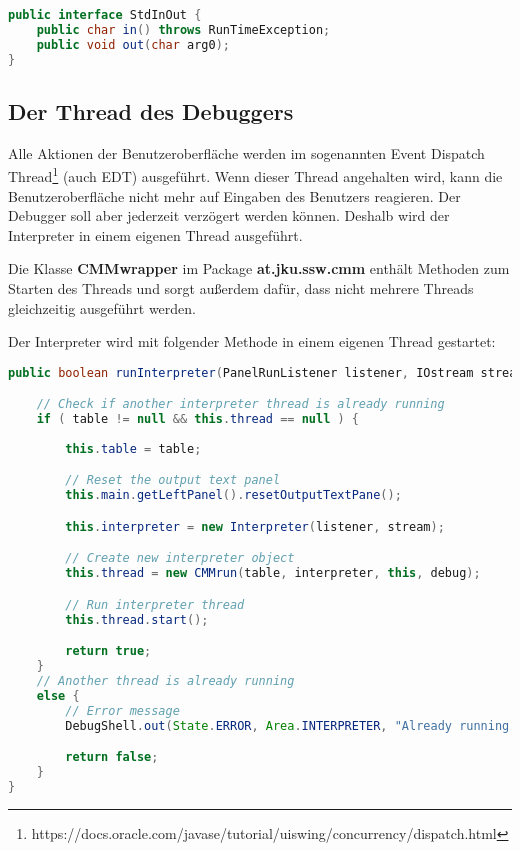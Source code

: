 \begin{lstlisting}[language=JAVA]
public interface StdInOut {
	public char in() throws RunTimeException;
	public void out(char arg0);
}
\end{lstlisting}


\subsection{Der Thread des Debuggers}
Alle Aktionen der Benutzeroberfläche werden im sogenannten Event Dispatch Thread\footnote{https://docs.oracle.com/javase/tutorial/uiswing/concurrency/dispatch.html} (auch EDT) ausgeführt. Wenn dieser Thread angehalten wird, kann die Benutzeroberfläche nicht mehr auf Eingaben des Benutzers reagieren. Der Debugger soll aber jederzeit verzögert werden können. Deshalb wird der Interpreter in einem eigenen Thread ausgeführt.

Die Klasse \textbf{CMMwrapper} im Package \textbf{at.jku.ssw.cmm} enthält Methoden zum Starten des Threads und sorgt außerdem dafür, dass nicht mehrere Threads gleichzeitig ausgeführt werden.

Der Interpreter wird mit folgender Methode in einem eigenen Thread gestartet:
\begin{lstlisting}[language=JAVA]
public boolean runInterpreter(PanelRunListener listener, IOstream stream, Tab table) {

	// Check if another interpreter thread is already running
	if ( table != null && this.thread == null ) {
			
		this.table = table;

		// Reset the output text panel
		this.main.getLeftPanel().resetOutputTextPane();

		this.interpreter = new Interpreter(listener, stream);

		// Create new interpreter object
		this.thread = new CMMrun(table, interpreter, this, debug);

		// Run interpreter thread
		this.thread.start();

		return true;
	}
	// Another thread is already running
	else {
		// Error message
		DebugShell.out(State.ERROR, Area.INTERPRETER, "Already running or not compiled!");

		return false;
	}
}
\end{lstlisting}

